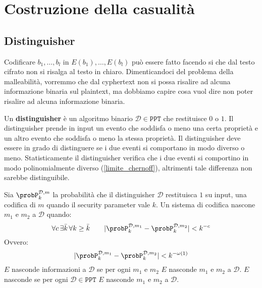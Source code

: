 \chapter{Costruzione della casualità}
\section{Distinguisher}\label{sec:distinguisher}
Codificare $b_1, \dots, b_l$ in $E(b_1), \dots, E(b_l)$ può essere fatto facendo si che dal testo cifrato non si risalga 
al testo in chiaro. Dimenticandoci del problema della malleabilità, vorremmo che dal cyphertext non si possa risalire
ad alcuna informazione binaria sul plaintext, ma dobbiamo capire cosa vuol dire non poter risalire ad alcuna informazione
binaria.
\begin{tcolorbox}[title = Distinguisher]
  Un \textbf{distinguisher} è un algoritmo binario $\mathcal{D} \in \texttt{PPT}$ che restituisce $0$ o $1$. Il distinguisher
  prende in input un evento che soddisfa o meno una certa proprietà e 
  un altro evento che soddisfa o meno la stessa proprietà. Il distinguisher deve essere in grado di distinguere
  se i due eventi si comportano in modo diverso o meno.
  Statisticamente il distinguisher verifica che i due eventi si comportino in modo polinomialmente diverso
  (\ref{limite_chernoff}), altrimenti tale differenza non sarebbe distinguibile.
\end{tcolorbox}
Sia $\probP_k^{\mathcal{D}, m}$ la probabilità che il distinguisher $\mathcal{D}$ restituisca $1$ su input, una codifica 
di $m$ quando il security parameter vale $k$. Un sistema di codifica nascone $m_1$ e $m_2$ a $\mathcal{D}$ quando:
\begin{equation}
  \forall c \, \exists \bar{k} \, \forall k \geq \bar{k} \qquad
  |\probP_k^{\mathcal{D}, m_1} - \probP_k^{\mathcal{D}, m_2}| < k^{-c}
\end{equation}
Ovvero:
\begin{equation}
  |\probP_k^{\mathcal{D}, m_1} - \probP_k^{\mathcal{D}, m_2}| < k^{-\omega(1)}
\end{equation}
$E$ nasconde informazioni a $\mathcal{D}$ se per ogni $m_1$ e $m_2$ $E$ nasconde $m_1$ e $m_2$ a $\mathcal{D}$. 
$E$ nasconde se per ogni $\mathcal{D} \in \texttt{PPT}$ $E$ nasconde $m_1$ e $m_2$ a $\mathcal{D}$.
